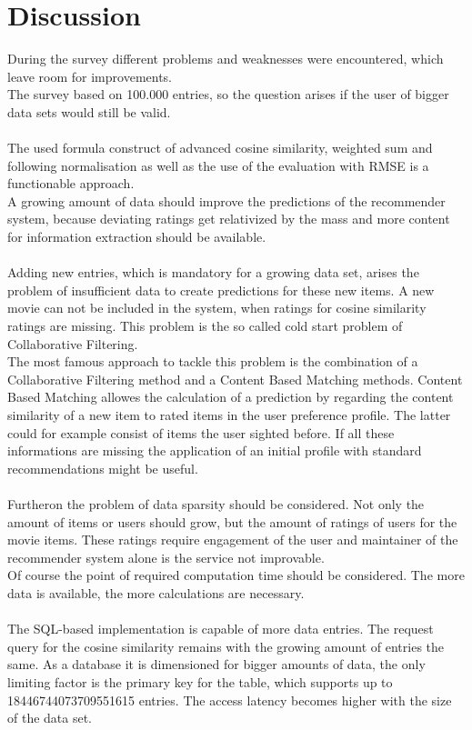 \documentclass[a4paper,12pt,twoside]{article}
\begin{document}
\section{Discussion}
During the survey different problems and weaknesses were encountered, which leave room for improvements.\\
The survey based on 100.000 entries, so the question arises if the user of bigger data sets would still be valid.\\
\\
The used formula construct of advanced cosine similarity, weighted sum and following normalisation as well as the use of the evaluation with RMSE is a functionable approach.\\
A growing amount of data should improve the predictions of the recommender system, because deviating ratings get relativized by the mass and more content for information extraction should be available.\\ 
\\
Adding new entries, which is mandatory for a growing data set, arises the problem of insufficient data to create predictions for these new items. A new movie can not be included in the system, when ratings for cosine similarity ratings are missing. This problem is the so called cold start problem of Collaborative Filtering.\\
The most famous approach to tackle this problem is the combination of a Collaborative Filtering method and a Content Based Matching methods. Content Based Matching allowes the calculation of a prediction by regarding the content similarity of a new item to rated items in the user preference profile. The latter could for example consist of items the user sighted before. If all these informations are missing the application of an initial profile with standard recommendations might be useful.\\
\\
Furtheron the problem of data sparsity should be considered. Not only the amount of items or users should grow, but the amount of ratings of users for the movie items. These ratings require engagement of the user and maintainer of the recommender system alone is the service not improvable.\\
Of course the point of required computation time should be considered. The more data is available, the more calculations are necessary.\\
\\
The SQL-based implementation is capable of more data entries. The request query for the cosine similarity remains with the growing amount of entries the same. As a database it is dimensioned for bigger amounts of data, the only limiting factor is the primary key for the table, which supports up to 18446744073709551615 entries. \cite{sql} The access latency becomes higher with the size of the data set.\\
\end{document}
